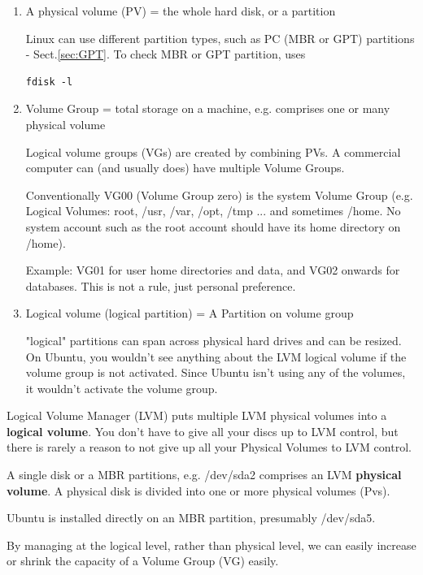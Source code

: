 \begin{enumerate}
  \item  A physical volume (PV) = the whole hard disk, or a partition

Linux can use different partition types, such as PC (MBR or GPT)
partitions - Sect.\ref{sec:GPT}. To check MBR or GPT partition, uses 
\begin{verbatim}
fdisk -l
\end{verbatim}
  
  \item Volume Group = total storage on a machine, e.g. comprises one or many
  physical volume 

Logical volume groups (VGs) are created by combining PVs. A commercial computer
can (and usually does) have multiple Volume Groups.


Conventionally VG00 (Volume Group zero) is the system Volume Group (e.g. Logical
Volumes: root, /usr, /var, /opt, /tmp ... and sometimes /home. No system account
such as the root account should have its home directory on /home).

Example:  VG01 for user home directories and data, and VG02 onwards for
databases. This is not a rule, just personal preference.
  
  \item Logical volume (logical partition) = A Partition on volume group

"logical" partitions can span across physical hard drives and can be resized.
On Ubuntu, you wouldn't see anything about the LVM logical volume if the volume
group is not activated. Since Ubuntu isn't using any of the volumes, it wouldn't
activate the volume group.  


\end{enumerate}

Logical Volume Manager (LVM) puts multiple LVM physical volumes into a{\bf
logical volume}. You don't have to give all your discs up to LVM control, but
there is rarely a reason to not give up all your Physical Volumes to LVM
control.


A single disk or a MBR partitions, e.g.
/dev/sda2 comprises an LVM {\bf physical volume}. A physical disk is divided
into one or more physical volumes (Pvs).

Ubuntu is installed directly on an MBR partition, presumably /dev/sda5.

 
By managing at the logical level, rather than physical level, we can easily
increase or shrink the capacity of a Volume Group (VG) easily.

